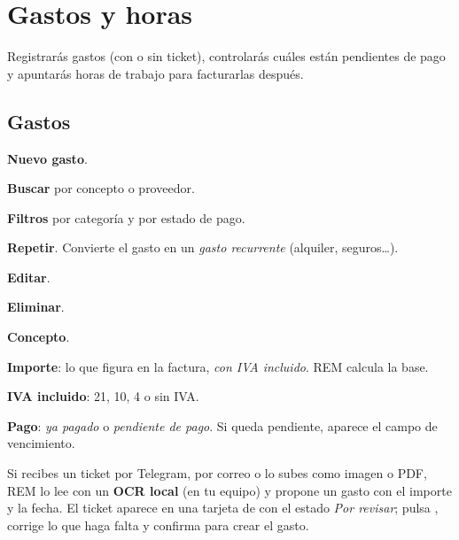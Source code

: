 \chapter{Gastos y horas}\label{cap:gastos}

\begin{objbox}
Registrarás gastos (con o sin ticket), controlarás cuáles están pendientes de pago y apuntarás horas de trabajo para facturarlas después.
\end{objbox}

\section{Gastos}
\begin{leyenda}
\item[\mk{1}] \textbf{Nuevo gasto}.
\item[\mk{2}] \textbf{Buscar} por concepto o proveedor.
\item[\mk{3}] \textbf{Filtros} por categoría y por estado de pago.
\item[\mk{4}] \textbf{Repetir}. Convierte el gasto en un \emph{gasto recurrente} (alquiler, seguros…).
\item[\mk{5}] \textbf{Editar}.
\item[\mk{6}] \textbf{Eliminar}.
\end{leyenda}

\begin{leyenda}
\item[\mk{1}] \textbf{Concepto}.
\item[\mk{2}] \textbf{Importe}: lo que figura en la factura, \emph{con IVA incluido}. REM calcula la base.
\item[\mk{3}] \textbf{IVA incluido}: 21, 10, 4 o sin IVA.
\item[\mk{4}] \textbf{Pago}: \emph{ya pagado} o \emph{pendiente de pago}. Si queda pendiente, aparece el campo de vencimiento.
\end{leyenda}

\begin{aibox}
Si recibes un ticket por Telegram, por correo o lo subes como imagen o PDF, REM lo lee con un \textbf{OCR local} (en tu equipo) y propone un gasto con el importe y la fecha. El ticket aparece en una tarjeta de  con el estado \emph{Por revisar}; pulsa , corrige lo que haga falta y confirma para crear el gasto.
\end{aibox}

